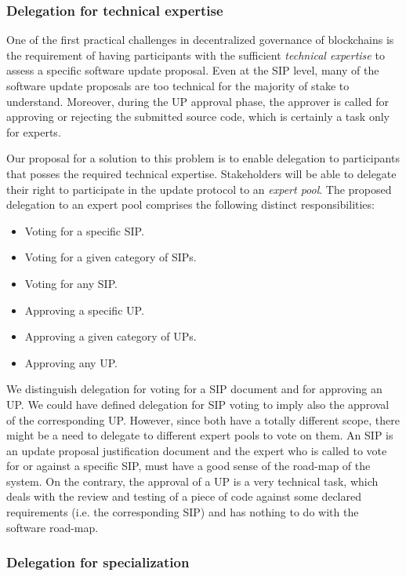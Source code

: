 \documentclass[11pt,a4paper]{article}
\begin{document}
\subsubsection{Delegation for technical expertise}
\label{sec:deleg-techn-expert}

One of the first practical challenges in decentralized governance of blockchains
is the requirement of having participants with the sufficient \emph{technical
  expertise} to assess a specific software update proposal.
%
Even at the SIP level, many of the software update proposals are too technical
for the majority of stake to understand.
%
Moreover, during the UP approval phase, the approver is called for approving or
rejecting the submitted source code, which is certainly a task only for experts.

Our proposal for a solution to this problem is to enable delegation to
participants that posses the required technical expertise.
%
Stakeholders will be able to delegate their right to participate in the update
protocol to an \emph{expert pool}. The proposed delegation to an expert pool
comprises the following distinct responsibilities:
\begin{itemize}
\item Voting for a specific SIP.
\item Voting for a given category of SIPs.
\item Voting for any SIP.
\item Approving a specific UP.
\item Approving a given category of UPs.
\item Approving any UP.
\end{itemize}
We distinguish delegation for voting for a SIP document and for approving an UP.
We could have defined delegation for SIP voting to imply also the approval of
the corresponding UP. However, since both have a totally different scope, there
might be a need to delegate to different expert pools to vote on them. An SIP is
an update proposal justification document and the expert who is called to vote
for or against a specific SIP, must have a good sense of the road-map of the
system. On the contrary, the approval of a UP is a very technical task, which
deals with the review and testing of a piece of code against some declared
requirements (i.e. the corresponding SIP) and has nothing to do with the
software road-map.

\subsubsection{Delegation for specialization}
\label{sec:deleg-spec}
\end{document}
